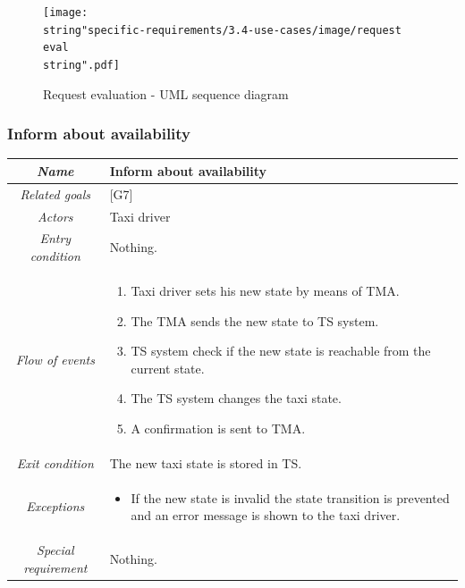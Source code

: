 \clearpage{}

\begin{landscape}

\begin{figure}[H]
\begin{centering}
\texttt{[image: \\string"specific-requirements/3.4-use-cases/image/request eval\\string".pdf]}
\par\end{centering}

\protect\caption{Request evaluation - UML sequence diagram}
\end{figure}


\end{landscape}

\clearpage{}


\subsubsection{Inform about availability}

\begin{flushleft}
\begin{tabular}{c|>{\raggedright}p{10cm}}
\hline 
\emph{Name} & \raggedright{}Inform about availability\tabularnewline
\hline 
\emph{Related goals} & \raggedright{}{[}G7{]}\tabularnewline
\hline 
\emph{Actors} & \raggedright{}Taxi driver\tabularnewline
\hline 
\emph{Entry condition} & \raggedright{}Nothing.\tabularnewline
\hline 
\emph{Flow of events} & \begin{enumerate}
\item \begin{raggedright}
Taxi driver sets his new state by means of TMA.
\par\end{raggedright}
\item \begin{raggedright}
The TMA sends the new state to TS system.
\par\end{raggedright}
\item TS system check if the new state is reachable from the current state.
\item \begin{raggedright}
The TS system changes the taxi state.
\par\end{raggedright}
\item \raggedright{}A confirmation is sent to TMA.\end{enumerate}
\tabularnewline
\hline 
\emph{Exit condition} & \raggedright{}The new taxi state is stored in TS.\tabularnewline
\hline 
\emph{Exceptions} & \begin{itemize}
\item If the new state is invalid the state transition is prevented and
an error message is shown to the taxi driver.\end{itemize}
\tabularnewline
\hline 
\emph{Special requirement} & \raggedright{}Nothing.\tabularnewline
\hline 
\end{tabular}
\par\end{flushleft}

